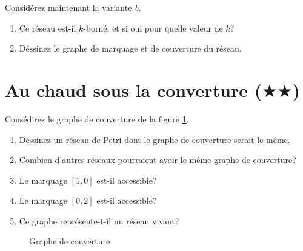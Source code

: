 \documentclass[a4paper, titlepage]{article}
\begin{document}
Considérez maintenant la variante \emph{b}.

\begin{enumerate}
  \item Ce réseau est-il $k$-borné, et si oui pour quelle valeur de $k$?
  \item Déssinez le graphe de marquage et de couverture du réseau.
\end{enumerate}

\section{Au chaud sous la converture ($\bigstar\bigstar$)}

Consédirez le graphe de couverture de la figure \ref{fig:couverture}.

\begin{enumerate}
  \item Déssinez un réseau de Petri dont le graphe de couverture serait le même.
  \item Combien d'autres réseaux pourraient avoir le même graphe de couverture?
  \item Le marquage $[1,0]$ est-il accessible?
  \item Le marquage $[0,2]$ est-il accessible?
  \item Ce graphe représente-t-il un réseau vivant?
\end{enumerate}

\begin{figure}[ht]
	\centering
	\caption{Graphe de couverture}
	\label{fig:couverture}
\end{figure}
\end{document}
